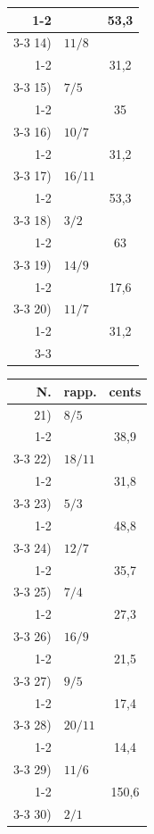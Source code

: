 \begin{center}
\begin{tabular}[t]{r @{\,} l c}
  \cmidrule(lr){1-2}
     &       & 53,3 \\
  \cmidrule(lr){3-3}
  14) & $11/8$ & \\
  \cmidrule(lr){1-2}
     &       & 31,2 \\
  \cmidrule(lr){3-3}
  15) & $7/5$ & \\
  \cmidrule(lr){1-2}
     &       & 35 \\
  \cmidrule(lr){3-3}
  16) & $10/7$ & \\
  \cmidrule(lr){1-2}
     &       & 31,2 \\
  \cmidrule(lr){3-3}
  17) & $16/11$ & \\
  \cmidrule(lr){1-2}
     &       & 53,3 \\
  \cmidrule(lr){3-3}
  18) & $3/2$ & \\
  \cmidrule(lr){1-2}
     &       & 63 \\
  \cmidrule(lr){3-3}
  19) & $14/9$ & \\
  \cmidrule(lr){1-2}
     &       & 17,6 \\
  \cmidrule(lr){3-3}
  20) & $11/7$ & \\
  \cmidrule(lr){1-2}
     &       & 31,2 \\
  \cmidrule(lr){3-3}
\bottomrule
\end{tabular}
\qquad
\begin{tabular}[t]{r @{\,} l c}
\toprule
N. & rapp. & cents \\
\midrule
  21) & $8/5$ & \\
  \cmidrule(lr){1-2}
     &       & 38,9 \\
  \cmidrule(lr){3-3}
  22) & $18/11$ & \\
  \cmidrule(lr){1-2}
     &       & 31,8 \\
  \cmidrule(lr){3-3}
  23) & $5/3$ & \\
  \cmidrule(lr){1-2}
     &       & 48,8 \\
  \cmidrule(lr){3-3}
  24) & $12/7$ & \\
  \cmidrule(lr){1-2}
     &       & 35,7 \\
  \cmidrule(lr){3-3}
  25) & $7/4$ & \\
  \cmidrule(lr){1-2}
     &       & 27,3 \\
  \cmidrule(lr){3-3}
  26) & $16/9$ & \\
  \cmidrule(lr){1-2}
     &       & 21,5 \\
  \cmidrule(lr){3-3}
  27) & $9/5$ & \\
  \cmidrule(lr){1-2}
     &       & 17,4 \\
  \cmidrule(lr){3-3}
  28) & $20/11$ & \\
  \cmidrule(lr){1-2}
     &       & 14,4 \\
  \cmidrule(lr){3-3}
  29) & $11/6$ & \\
  \cmidrule(lr){1-2}
     &       & 150,6 \\
  \cmidrule(lr){3-3}
  30) & $2/1$ & \\
\bottomrule
\end{tabular}
\end{center}

